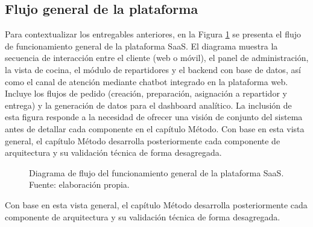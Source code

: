 \subsection*{Flujo general de la plataforma}

Para contextualizar los entregables anteriores, en la Figura \ref{fig:diagrama_flujo} se presenta el flujo de funcionamiento general de la plataforma SaaS. El diagrama muestra la secuencia de interacción entre el cliente (web o móvil), el panel de administración, la vista de cocina, el módulo de repartidores y el backend con base de datos, así como el canal de atención mediante chatbot integrado en la plataforma web. Incluye los flujos de pedido (creación, preparación, asignación a repartidor y entrega) y la generación de datos para el dashboard analítico. La inclusión de esta figura responde a la necesidad de ofrecer una visión de conjunto del sistema antes de detallar cada componente en el capítulo Método. Con base en esta vista general, el capítulo Método desarrolla posteriormente cada componente de
arquitectura y su validación técnica de forma desagregada.

\begin{figure}[htbp]
\centering
\resizebox{\textwidth}{!}{}
\caption[Diagrama de flujo del funcionamiento general de la plataforma SaaS]	{Diagrama de flujo del funcionamiento general de la plataforma SaaS. Fuente: elaboración propia.}
\label{fig:diagrama_flujo}
\end{figure}

Con base en esta vista general, el capítulo Método desarrolla posteriormente cada componente de arquitectura y su validación técnica de forma desagregada.
